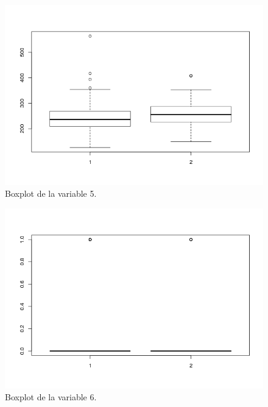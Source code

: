 \documentclass[12pt,a4paper]{article}
\begin{document}
\begin{figure}[H]
	\centering
	\includegraphics[scale=0.6]{./Imagenes/EDA/Clasificacion/boxplot_variable5.png}
	\caption{Boxplot de la variable 5.}
\end{figure}

\begin{figure}[H]
	\centering
	\includegraphics[scale=0.6]{./Imagenes/EDA/Clasificacion/boxplot_variable6.png}
	\caption{Boxplot de la variable 6.}
\end{figure}
\end{document}
